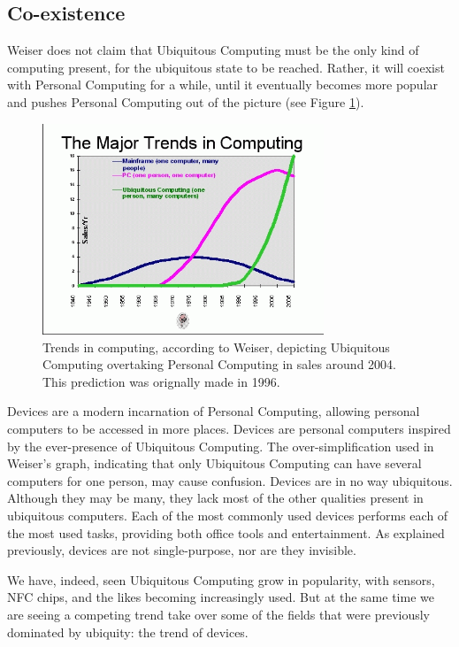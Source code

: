 \subsection*{Co-existence}

Weiser does not claim that Ubiquitous Computing must be the only kind of computing present, for the ubiquitous state to be reached.
Rather, it will coexist with Personal Computing for a while, until it eventually becomes more popular and pushes Personal Computing
out of the picture (see Figure \ref{fig:trends-graph}).

\begin{figure}[htb]
	\centering
	\includegraphics[width=0.75\textwidth]{multipurpose/trends-graph}
	\caption{Trends in computing, according to Weiser, depicting Ubiquitous Computing overtaking Personal Computing in sales around
		2004. This prediction was orignally made in 1996.\cite{weisernomadic}}
	\label{fig:trends-graph}
\end{figure}

Devices are a modern incarnation of Personal Computing, allowing personal computers to be accessed in more places. Devices are personal
computers inspired by the ever-presence of Ubiquitous Computing. The over-simplification used in Weiser's graph, indicating that only
Ubiquitous Computing can have several computers for one person, may cause confusion. Devices are in no way ubiquitous. Although they may
be many, they lack most of the other qualities present in ubiquitous computers. Each
of the most commonly used devices performs each of the most used tasks, providing both office tools and entertainment. As explained
previously, devices are not single-purpose, nor are they invisible.

We have, indeed, seen Ubiquitous Computing grow in popularity, with sensors, NFC chips, and the likes becoming increasingly used. But
at the same time we are seeing a competing trend take over some of the fields that were previously dominated by ubiquity: the trend of
devices.

